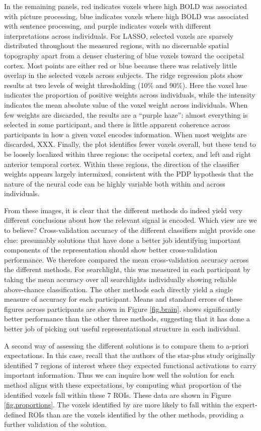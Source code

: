 In the remaining panels, red indicates voxels where high BOLD was associated with picture processing, blue indicates voxels where high BOLD was associated with sentence processing, and purple indicates voxels with different interpretations across individuals. For LASSO, selected voxels are sparsely distributed throughout the measured regions, with no discernable spatial topography apart from a denser clustering of blue voxels toward the occipetal cortex. Most points are either red or blue because there was relatively little overlap in the selected voxels across subjects. The ridge regression plots show results at two levels of weight thresholding (10\% and 90\%). Here the voxel hue indicates the proportion of positive weights across individuals, while the intensity indicates the mean absolute value of the voxel weight across individuals. When few weights are discarded, the results are a ``purple haze'': almost everything is selected in some participant, and there is little apparent coherence across participants in how a given voxel encodes information. When most weights are discarded, XXX. Finally, the \soslasso plot identifies fewer voxels overall, but these tend to be loosely localized within three regions: the occipetal cortex, and left and right anterior temporal cortex. Within these regions, the direction of the classifier weights appears largely intermixed, consistent with the PDP hypothesis that the nature of the neural code can be highly variable both within and across individuals.

From these images, it is clear that the different methods do indeed yield very different conclusions about how the relevant signal is encoded. Which view are we to believe? Cross-validation accuracy of the different classifiers might provide one clue: presumably solutions that have done a better job identifying important components of the representation should show better cross-validation performance. We therefore compared the mean cross-validation accuracy across the different methods. For searchlight, this was measured in each participant by taking the mean accuracy over all searchlights individually showing reliable above-chance classification. The other methods each directly yield a single measure of accuracy for each participant. Means and standard errors of these figures across participants are shown in Figure \ref{fig.brain}. \soslasso shows significantly better performance than the other three methods, suggesting that it has done a better job of picking out useful representational structure in each individual.

A second way of assessing the different solutions is to compare them to a-priori expectations. In this case, recall that the authors of the star-plus study originally identified 7 regions of interest where they expected functional activations to carry important information. Thus we can inquire how well the solution for each method aligns with these expectations, by computing what proportion of the identified voxels fall within these 7 ROIs. These data are shown in Figure \ref{fig.proportions}. The voxels identified by \soslasso are more likely to fall within the expert-defined ROIs than are the voxels identified by the other methods, providing a further validation of the \soslasso solution.

